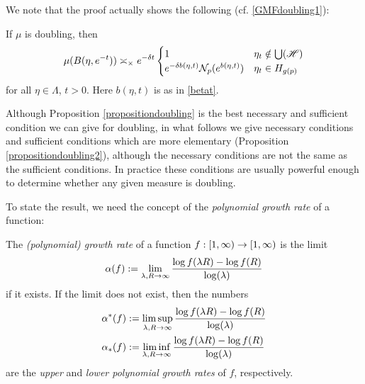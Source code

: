 We note that the proof actually shows the following (cf. \eqref{GMFdoubling1}):

\begin{corollary}
\label{corollaryGMFdoubling}
If $\mu$ is doubling, then
\[
\mu(B(\eta,e^{-t})) \asymp_\times e^{-\delta t} \begin{cases}
1 & \eta_t\notin \bigcup(\mathscr H)\\
e^{-\delta b(\eta,t)} \mathcal N_p(e^{b(\eta,t)}) & \eta_t\in H_{g(p)}
\end{cases}
\]
for all $\eta\in\Lambda$, $t > 0$. Here $b(\eta,t)$ is as in \eqref{betat}.
\end{corollary}

Although Proposition \ref{propositiondoubling} is the best necessary and sufficient condition we can give for doubling, in what follows we give necessary conditions and sufficient conditions which are more elementary (Proposition \ref{propositiondoubling2}), although the necessary conditions are not the same as the sufficient conditions. In practice these conditions are usually powerful enough to determine whether any given measure is doubling.

To state the result, we need the concept of the \emph{polynomial growth rate} of a function:

\begin{definition}
\label{definitiongrowthrate}
The \emph{(polynomial) growth rate} of a function $f:[1,\infty) \to [1,\infty)$ is the limit
\[
\alpha(f) := \lim_{\lambda,R\to\infty}\frac{\log f(\lambda R) - \log f(R)}{\log(\lambda)}
\]
if it exists. If the limit does not exist, then the numbers
\begin{align*}
\alpha^*(f) &:= \limsup_{\lambda,R\to\infty}\frac{\log f(\lambda R) - \log f(R)}{\log(\lambda)}\\
\alpha_*(f) &:= \liminf_{\lambda,R\to\infty}\frac{\log f(\lambda R) - \log f(R)}{\log(\lambda)}
\end{align*}
are the \emph{upper} and \emph{lower polynomial growth rates} of $f$, respectively.
\end{definition}

%

